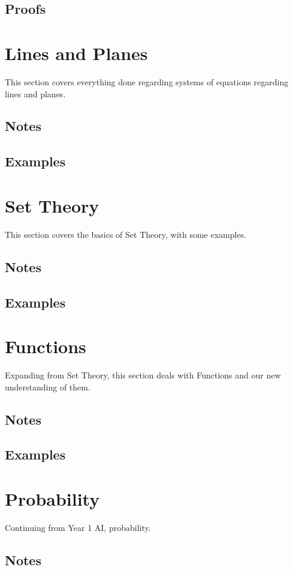 \subsection{Proofs}

\section{Lines and Planes}
This section covers everything done regarding systems of equations regarding lines and planes.
\subsection{Notes}
\subsection{Examples}

\section{Set Theory}
This section covers the basics of Set Theory, with some examples.
\subsection{Notes}
\subsection{Examples}

\section{Functions}
Expanding from Set Theory, this section deals with Functions and our new understanding of them.
\subsection{Notes}
\subsection{Examples}

\section{Probability}
Continuing from Year 1 AI, probability.
\subsection{Notes}
